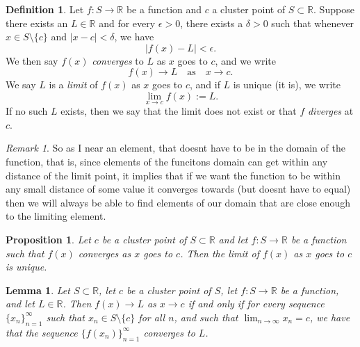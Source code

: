\documentclass{article}
\newtheorem{lemma}{Lemma}[section]
\newtheorem{proposition}{Proposition}[section]
\theoremstyle{definition}
\newtheorem{definition}{Definition}[section]
\theoremstyle{remark}
\newtheorem{remark}{Remark}[section]
\begin{document}
\vspace{.5cm}
\begin{definition}
Let $f : S \to \mathbb{R}$ be a function and $c$ a cluster point of $S \subset \mathbb{R}$. Suppose there exists an $L \in \mathbb{R}$ and for every $\epsilon > 0$, there exists a $\delta > 0$ such that whenever $x \in S \setminus \{c\}$ and $|x - c| < \delta$, we have
\[
|f(x) - L| < \epsilon.
\]
We then say $f(x)$ \textit{converges} to $L$ as $x$ goes to $c$, and we write
\[
f(x) \to L \quad \text{as} \quad x \to c.
\]
We say $L$ is a \textit{limit} of $f(x)$ as $x$ goes to $c$, and if $L$ is unique (it is), we write
\[
\lim_{x\to c} f(x) := L.
\]
If no such $L$ exists, then we say that the limit does not exist or that $f$ \textit{diverges} at $c$.

\end{definition}

\begin{remark}
So as I near an element, that doesnt have to be in the domain of the function, that is, 
since elements of the funcitons domain can get within any distance of the limit point,
it implies that if we want the function to be within any small distance of some value it converges towards (but doesnt have to equal) 
then we will always be able to find elements of our domain that are close enough to 
the limiting element. 
\end{remark}



\vspace{.5cm}
\begin{proposition}
Let $c$ be a cluster point of $S \subset \mathbb{R}$ and let $f : S \to \mathbb{R}$ be a function such that $f(x)$ converges as $x$ goes to $c$. Then the limit of $f(x)$ as $x$ goes to $c$ is unique.
\end{proposition}


\vspace{.5cm}
\begin{lemma}
Let $S \subset \mathbb{R}$, let $c$ be a cluster point of $S$, let $f : S \to \mathbb{R}$ be a function, and let $L \in \mathbb{R}$. Then $f(x) \to L$ as $x \to c$ if and only if for every sequence $\{x_n\}_{n=1}^{\infty}$ such that $x_n \in S \setminus \{c\}$ for all $n$, and such that $\lim_{n\to\infty} x_n = c$, we have that the sequence $\{f(x_n)\}_{n=1}^{\infty}$ converges to $L$.
\end{lemma}
\end{document}
